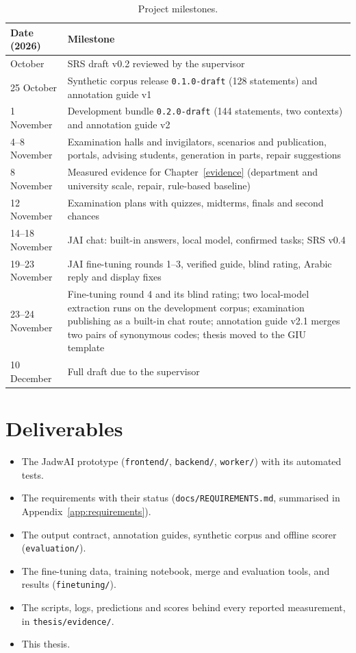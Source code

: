 \begin{longtable}[]{@{}p{}p{}@{}}
\caption{Project milestones.}\label{tab:timeline}\\
\toprule
Date (2026) & Milestone \\
\midrule
\endhead
\bottomrule
\endlastfoot
10 October & SRS draft v0.2 reviewed by the supervisor \\
25 October & Synthetic corpus release \texttt{0.1.0-draft} (128 statements) and annotation guide v1 \\
1 November & Development bundle \texttt{0.2.0-draft} (144 statements, two contexts) and annotation guide v2 \\
4--8 November & Examination halls and invigilators, scenarios and publication, portals, advising students, generation in parts, repair suggestions \\
8 November & Measured evidence for Chapter~\ref{evidence} (department and university scale, repair, rule-based baseline) \\
12 November & Examination plans with quizzes, midterms, finals and second chances \\
14--18 November & JAI chat: built-in answers, local model, confirmed tasks; SRS v0.4 \\
19--23 November & JAI fine-tuning rounds 1--3, verified guide, blind rating, Arabic reply and display fixes \\
23--24 November & Fine-tuning round 4 and its blind rating; two local-model extraction runs on the development corpus; examination publishing as a built-in chat route; annotation guide v2.1 merges two pairs of synonymous codes; thesis moved to the GIU template \\
10 December & Full draft due to the supervisor \\
\end{longtable}

\section{Deliverables}\label{proposed-deliverables-of-the-study}

\begin{itemize}
\item The JadwAI prototype (\texttt{frontend/}, \texttt{backend/}, \texttt{worker/}) with its automated tests.
\item The requirements with their status (\texttt{docs/REQUIREMENTS.md}, summarised in Appendix~\ref{app:requirements}).
\item The output contract, annotation guides, synthetic corpus and offline scorer (\texttt{evaluation/}).
\item The fine-tuning data, training notebook, merge and evaluation tools, and results (\texttt{finetuning/}).
\item The scripts, logs, predictions and scores behind every reported measurement, in \texttt{thesis/evidence/}.
\item This thesis.
\end{itemize}

